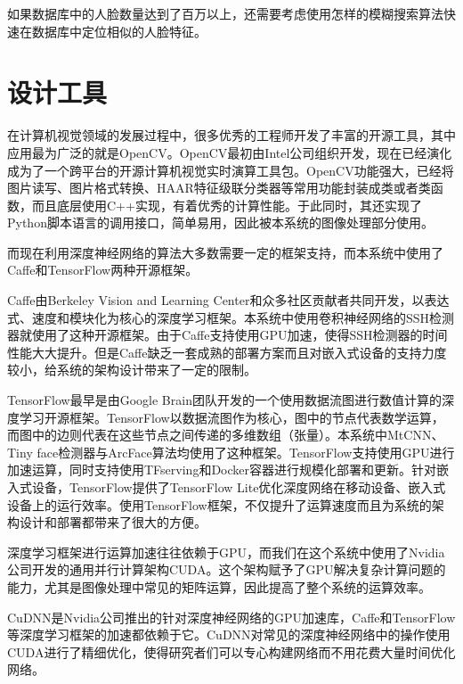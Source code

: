 如果数据库中的人脸数量达到了百万以上，还需要考虑使用怎样的模糊搜索算法快速在数据库中定位相似的人脸特征。

\section{设计工具}

在计算机视觉领域的发展过程中，很多优秀的工程师开发了丰富的开源工具，其中应用最为广泛的就是OpenCV\cite{opencv_library}。OpenCV最初由Intel公司组织开发，现在已经演化成为了一个跨平台的开源计算机视觉实时演算工具包。OpenCV功能强大，已经将图片读写、图片格式转换、HAAR特征级联分类器等常用功能封装成类或者类函数，而且底层使用C++实现，有着优秀的计算性能。于此同时，其还实现了Python脚本语言的调用接口，简单易用，因此被本系统的图像处理部分使用。

而现在利用深度神经网络的算法大多数需要一定的框架支持，而本系统中使用了Caffe\cite{jia2014caffe}和TensorFlow\cite{tensorflow2015-whitepaper}两种开源框架。

Caffe由Berkeley Vision and Learning Center和众多社区贡献者共同开发，以表达式、速度和模块化为核心的深度学习框架。本系统中使用卷积神经网络的SSH检测器就使用了这种开源框架。由于Caffe支持使用GPU加速，使得SSH检测器的时间性能大大提升。但是Caffe缺乏一套成熟的部署方案而且对嵌入式设备的支持力度较小，给系统的架构设计带来了一定的限制。

TensorFlow最早是由Google Brain团队开发的一个使用数据流图进行数值计算的深度学习开源框架。TensorFlow以数据流图作为核心，图中的节点代表数学运算，而图中的边则代表在这些节点之间传递的多维数组（张量）。本系统中MtCNN、Tiny face检测器与ArcFace算法均使用了这种框架。TensorFlow支持使用GPU进行加速运算，同时支持使用TFserving和Docker容器进行规模化部署和更新。针对嵌入式设备，TensorFlow提供了TensorFlow Lite优化深度网络在移动设备、嵌入式设备上的运行效率。使用TensorFlow框架，不仅提升了运算速度而且为系统的架构设计和部署都带来了很大的方便。

深度学习框架进行运算加速往往依赖于GPU，而我们在这个系统中使用了Nvidia公司开发的通用并行计算架构CUDA\cite{nickolls2008scalable}。这个架构赋予了GPU解决复杂计算问题的能力，尤其是图像处理中常见的矩阵运算，因此提高了整个系统的运算效率。

CuDNN\cite{chetlur2014cudnn}是Nvidia公司推出的针对深度神经网络的GPU加速库，Caffe和TensorFlow等深度学习框架的加速都依赖于它。CuDNN对常见的深度神经网络中的操作使用CUDA进行了精细优化，使得研究者们可以专心构建网络而不用花费大量时间优化网络。
